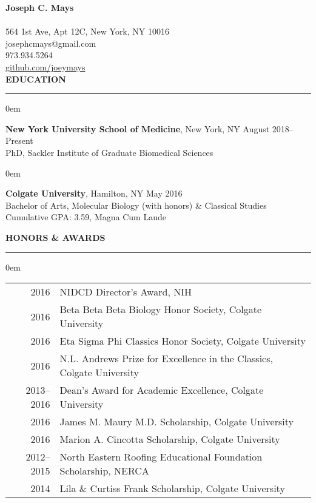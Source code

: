 \documentclass[11pt, letterpaper]{article}
\newenvironment{CVSection}{
\begin{addmargin}[2em]{0em}
\begin{samepage}}
{\end{samepage}
\end{addmargin}\bigskip}
\newcommand{\CVHeading}[1]{
\MakeUppercase{\bf #1}
\smallskip
\hrule
\medskip
}
\begin{document}
{\Huge\textbf{Joseph C. Mays}}\\\\
\faHome\hspace{2 mm}564 1st Ave, Apt 12C, New York, NY 10016\\
\faEnvelopeSquare\hspace{2.3 mm}josephcmays@gmail.com\\
\faPhone\hspace{2.4 mm}973.934.5264\\
\faGithub\hspace{2 mm}\href{https://github.com/joeymays}{github.com/joeymays}\\




\CVHeading{Education}
\begin{CVSection}
\textbf{New York University School of Medicine}, New York, NY \hfill August 2018--Present\\
PhD, Sackler Institute of Graduate Biomedical Sciences
\end{CVSection}
\begin{CVSection}
\textbf{Colgate University}, Hamilton, NY \hfill May 2016\\
Bachelor of Arts, Molecular Biology (with honors) \& Classical Studies\\ 
Cumulative GPA: 3.59, Magna Cum Laude
\end{CVSection}

\CVHeading{Honors \& Awards}
\begin{CVSection}
\begin{tabular}{r|l}
2016 & NIDCD Director’s Award, NIH\\
2016 & Beta Beta Beta Biology Honor Society, Colgate University\\
2016 & Eta Sigma Phi Classics Honor Society, Colgate University\\
2016 & N.L. Andrews Prize for Excellence in the Classics, Colgate University\\
2013--2016 & Dean’s Award for Academic Excellence, Colgate University\\
2016 & James M. Maury M.D. Scholarship, Colgate University\\
2016 & Marion A. Cincotta Scholarship, Colgate University\\
2012--2015 & North Eastern Roofing Educational Foundation Scholarship, NERCA\\
2014 & Lila \& Curtiss Frank Scholarship, Colgate University
\end{tabular}
\end{CVSection}
\end{document}
